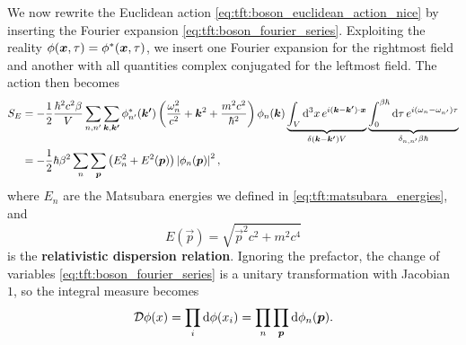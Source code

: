 We now rewrite the Euclidean action \eqref{eq:tft:boson_euclidean_action_nice} by inserting the Fourier expansion \eqref{eq:tft:boson_fourier_series}.
Exploiting the reality $\phi({\bm{x}}, \tau) = {\phi}^*({\bm{x}}, \tau)$, we insert one Fourier expansion for the rightmost field and another with all quantities complex conjugated for the leftmost field.
The action then becomes
\begin{equation}
\begin{split}
	S_E & = -\frac12 \frac{\hbar^2 c^2 \beta}{V}
	        \sum_{n,n'} \sum_{{\bm{k}},{\bm{k'}}} 
	    	  {\phi}^*_{n'}({\bm{k'}}) 
	    	  \left( \frac{\omega_n^2}{c^2} + {\bm{k}}^2 + \frac{m^2 c^2}{\hbar^2} \right)
	  	  \phi_{n}({\bm{k}})
	  	  \underbrace{\int_V \mathop{}\!\mathrm{d}^3 x \, e^{i ({\bm{k}} - {\bm{k'}}) \cdot {\bm{x}}}}_{\delta({\bm{k}}-{\bm{k'}}) V}
	      \underbrace{\int_0^{\beta \hbar} \mathop{}\!\mathrm{d} \tau \, e^{i (\omega_n - \omega_{n'}) \tau}}_{\delta_{n,n'} \beta \hbar}
	  	  \\
	    & = -\frac12 \hbar \beta^2
	        \sum_n \sum_{\bm{p}}
	  	    \left( E_n^2 + E^2({\bm{p}}) \right)
		    \left\lvert \phi_{n}({\bm{p}}) \right\rvert^2 ,
\end{split}
\label{eq:tft:boson_action_fourier}
\end{equation}
where $E_n$ are the Matsubara energies we defined in \cref{eq:tft:matsubara_energies}, and
\begin{equation}
	E(\vec{p}) = \sqrt{\vec{p}^2 c^2 + m^2 c^4}
\label{eq:tft:dispersion}
\end{equation}
is the \textbf{relativistic dispersion relation}.
Ignoring the prefactor, the change of variables \eqref{eq:tft:boson_fourier_series} is a unitary transformation with Jacobian $1$, so the integral measure becomes
\begin{equation}
	\mathcal{D} \phi(x) =
	\prod_i \mathop{}\!\mathrm{d} \phi(x_i) =
	\prod_n \prod_{\bm{p}} \mathop{}\!\mathrm{d} \phi_n({\bm{p}}) .
\label{eq:tft:boson_integral_new_variables}
\end{equation}


